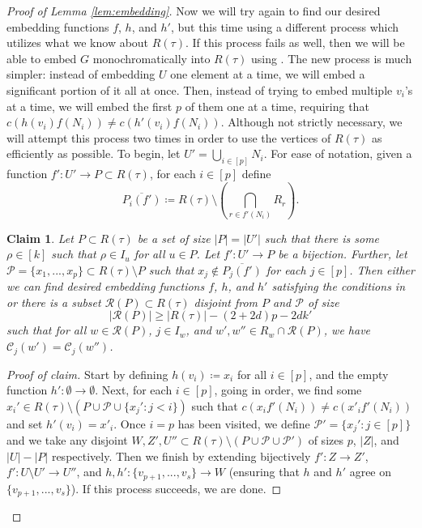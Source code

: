 \documentclass{article}
\newcommand{\cC}{\mathcal{C} }
\newcommand{\cP}{\mathcal{P} }
\newcommand{\cR}{\mathcal{R} }
\newtheorem{claim}[theorem]{Claim}
\theoremstyle{definition}
\newenvironment{subproof}[1][\proofname]{%
  \renewcommand{\qedsymbol}{$\blacksquare$}%
  \begin{proof}[#1]%
}{%
  \end{proof}%
}
\begin{document}
\begin{proof}[Proof of Lemma \ref{lem:embedding}]
Now we will try again to find our desired embedding functions $f$, $h$, and $h'$, but this time using a different process which utilizes what we know about $R(\tau)$. If this process fails as well, then we will be able to embed $G$ monochromatically into $R(\tau)$ using . The new process is much simpler: instead of embedding $U$ one element at a time, we will embed a significant portion of it all at once. Then, instead of trying to embed multiple $v_i$'s at a time, we will embed the first $p$ of them one at a time, requiring that $c(h(v_i)f(N_i))\neq c(h'(v_i)f(N_i))$. Although not strictly necessary, we will attempt this process two times in order to use the vertices of $R(\tau)$ as efficiently as possible.
To begin, let $U'=\bigcup_{i\in [p]} N_i$. For ease of notation, given a function $f':U' \to P\subset R(\tau)$, for each $i\in [p]$ define $$\overline{P_i(f')}
\coloneqq R(\tau) \setminus\left(\bigcap_{r\in f'(N_i)}R_r\right).$$

\begin{claim}\label{R_*}
    Let $P\subset R(\tau)$ be a set of size $|P|=|U'|$ such that there is some $\rho \in [k]$ such that $\rho\in I_u$ for all $u\in P$. Let $f':U'\to P$ be a bijection. Further, let $\cP=\{x_1,...,x_p\}\subset R(\tau)\setminus P$ such that $x_j\notin \overline{P_j(f')}$  for each $j\in [p]$. Then either we can find desired embedding functions $f$, $h$, and $h'$ satisfying the conditions in  or there is a subset $\cR(P)\subset R(\tau)$ disjoint from $P$ and $\cP$ of size $$|\cR(P)|\geq |R(\tau)|-(2+2d)p-2dk'$$ such that for all $w\in \cR(P)$, $j\in I_w$, and $w',w''\in R_w\cap \cR(P)$, we have $\cC_j(w')=\cC_j(w'')$.
\end{claim}

\begin{subproof}[Proof of claim]
Start by defining $h(v_i)\coloneqq x_i$ for all $i\in [p]$, and the empty function $h': \emptyset \to \emptyset$. Next, for each $i\in[p]$, going in order, we find some $x_i'\in R(\tau)\setminus (P\cup \cP \cup \{x_j':j<i\})$ such that $c(x_if'(N_i))\neq c(x'_if'(N_i))$ and set $h'(v_i)=x'_i$. Once $i=p$ has been visited, we define $\cP' = \{x_j':j\in [p]\}$ and
we take any disjoint $W,Z',U''\subset R(\tau)\setminus (P\cup \cP \cup \cP')$ of sizes $p$, $|Z|$, and $|U|-|P|$ respectively. Then we finish by extending bijectively $f':Z\to Z'$, $f':U\setminus U'\to U''$, and $h,h':\{v_{p+1},...,v_s\}\to W$ (ensuring that $h$ and $h'$ agree on $\{v_{p+1},...,v_s\}$). If this process succeeds, we are done.


\end{subproof}
\end{proof}
\end{document}
